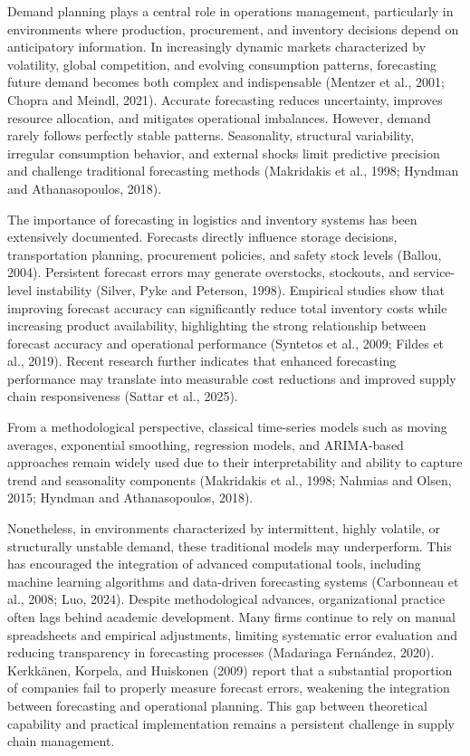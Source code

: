 \documentclass[journal,article,submit,pdftex,moreauthors]{Definitions/mdpi}
\begin{document}
Demand planning plays a central role in operations management, particularly in environments where production, procurement, and inventory decisions depend on anticipatory information. In increasingly dynamic markets characterized by volatility, global competition, and evolving consumption patterns, forecasting future demand becomes both complex and indispensable (Mentzer et al., 2001; Chopra and Meindl, 2021). Accurate forecasting reduces uncertainty, improves resource allocation, and mitigates operational imbalances. However, demand rarely follows perfectly stable patterns. Seasonality, structural variability, irregular consumption behavior, and external shocks limit predictive precision and challenge traditional forecasting methods (Makridakis et al., 1998; Hyndman and Athanasopoulos, 2018).

The importance of forecasting in logistics and inventory systems has been extensively documented. Forecasts directly influence storage decisions, transportation planning, procurement policies, and safety stock levels (Ballou, 2004). Persistent forecast errors may generate overstocks, stockouts, and service-level instability (Silver, Pyke and Peterson, 1998). Empirical studies show that improving forecast accuracy can significantly reduce total inventory costs while increasing product availability, highlighting the strong relationship between forecast accuracy and operational performance (Syntetos et al., 2009; Fildes et al., 2019). Recent research further indicates that enhanced forecasting performance may translate into measurable cost reductions and improved supply chain responsiveness (Sattar et al., 2025). 

From a methodological perspective, classical time-series models such as moving averages, exponential smoothing, regression models, and ARIMA-based approaches remain widely used due to their interpretability and ability to capture trend and seasonality components (Makridakis et al., 1998; Nahmias and Olsen, 2015; Hyndman and Athanasopoulos, 2018).

Nonetheless, in environments characterized by intermittent, highly volatile, or structurally unstable demand, these traditional models may underperform. This has encouraged the integration of advanced computational tools, including machine learning algorithms and data-driven forecasting systems (Carbonneau et al., 2008; Luo, 2024).
Despite methodological advances, organizational practice often lags behind academic development. Many firms continue to rely on manual spreadsheets and empirical adjustments, limiting systematic error evaluation and reducing transparency in forecasting processes (Madariaga Fernández, 2020). Kerkkänen, Korpela, and Huiskonen (2009) report that a substantial proportion of companies fail to properly measure forecast errors, weakening the integration between forecasting and operational planning. This gap between theoretical capability and practical implementation remains a persistent challenge in supply chain management.
\end{document}
